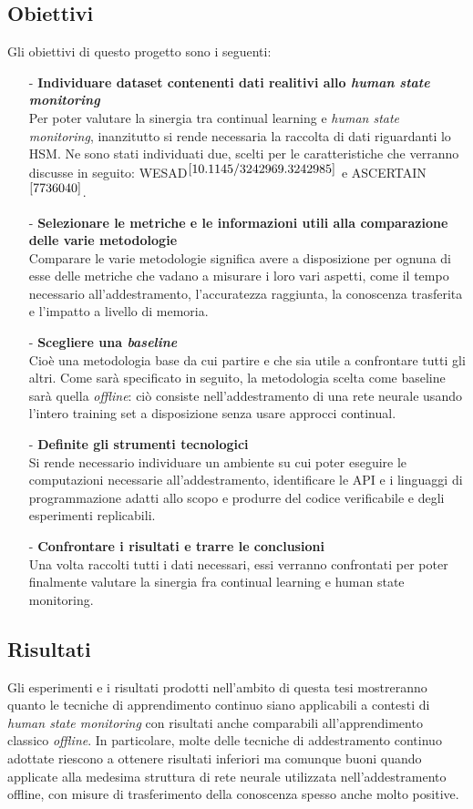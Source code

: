 \subsection*{Obiettivi}
Gli obiettivi di questo progetto sono i seguenti:
\begin{itemize}
    \item[-] \textbf{Individuare dataset contenenti dati realitivi allo \textit{human state monitoring}}\\
    Per poter valutare la sinergia tra continual learning e \textit{human state monitoring}, inanzitutto si rende necessaria la raccolta di dati riguardanti lo HSM. Ne sono stati individuati due, scelti per le caratteristiche che verranno discusse in seguito: WESAD$^{\cite{10.1145/3242969.3242985}}$ e ASCERTAIN$^{\cite{7736040}}$.
    \item[-] \textbf{Selezionare le metriche e le informazioni utili alla comparazione delle varie metodologie}\\
    Comparare le varie metodologie significa avere a disposizione per ognuna di esse delle metriche che vadano a misurare i loro vari aspetti, come il tempo necessario all'addestramento, l'accuratezza raggiunta, la conoscenza trasferita e l'impatto a livello di memoria.
    \item[-] \textbf{Scegliere una \textit{baseline}}\\
    Cioè una metodologia base da cui partire e che sia utile a confrontare tutti gli altri. Come sarà specificato in seguito, la metodologia scelta come baseline sarà quella \textit{offline}: ciò consiste nell'addestramento di una rete neurale usando l'intero training set a disposizione senza usare approcci continual.
    \item[-] \textbf{Definite gli strumenti tecnologici}\\
    Si rende necessario individuare un ambiente su cui poter eseguire le computazioni necessarie all'addestramento, identificare le API e i linguaggi di programmazione adatti allo scopo e produrre del codice verificabile e degli esperimenti replicabili.
    \item[-] \textbf{Confrontare i risultati e trarre le conclusioni}\\
    Una volta raccolti tutti i dati necessari, essi verranno confrontati per poter finalmente valutare la sinergia fra continual learning e human state monitoring.
\end{itemize}

\subsection*{Risultati}
Gli esperimenti e i risultati prodotti nell'ambito di questa tesi mostreranno quanto le tecniche di apprendimento continuo siano applicabili a contesti di \textit{human state monitoring} con risultati anche comparabili all'apprendimento classico \textit{offline}. In particolare, molte delle tecniche di addestramento continuo adottate riescono a ottenere risultati inferiori ma comunque buoni quando applicate alla medesima struttura di rete neurale utilizzata nell'addestramento offline, con misure di trasferimento della conoscenza spesso anche molto positive.

